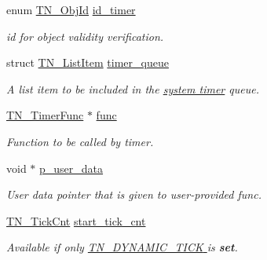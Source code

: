 \begin{DoxyCompactItemize}
\item 
enum \hyperlink{tn__common_8h_ae779dd1f6735f6e139fb70acd004d976}{T\+N\+\_\+\+Obj\+Id} \hyperlink{structTN__Timer_a27482d3470455064da95b9453ae87156}{id\+\_\+timer}
\begin{DoxyCompactList}\small\item\em id for object validity verification. \end{DoxyCompactList}\item 
\mbox{\label{structTN__Timer_a9418f1d84fa83d87197f3457ddb74e27}} 
struct \hyperlink{structTN__ListItem}{T\+N\+\_\+\+List\+Item} \hyperlink{structTN__Timer_a9418f1d84fa83d87197f3457ddb74e27}{timer\+\_\+queue}
\begin{DoxyCompactList}\small\item\em A list item to be included in the {\itshape \hyperlink{time_ticks}{system timer}} queue. \end{DoxyCompactList}\item 
\mbox{\label{structTN__Timer_a154ff9bb98135481b1874bdd8d6f2b9c}} 
\hyperlink{tn__timer_8h_a3139b6e571f7bd3d304a7bb87b5b2459}{T\+N\+\_\+\+Timer\+Func} $\ast$ \hyperlink{structTN__Timer_a154ff9bb98135481b1874bdd8d6f2b9c}{func}
\begin{DoxyCompactList}\small\item\em Function to be called by timer. \end{DoxyCompactList}\item 
\mbox{\label{structTN__Timer_aaf753d5fb1001702f07379b2ed7ac177}} 
void $\ast$ \hyperlink{structTN__Timer_aaf753d5fb1001702f07379b2ed7ac177}{p\+\_\+user\+\_\+data}
\begin{DoxyCompactList}\small\item\em User data pointer that is given to user-\/provided {\ttfamily func}. \end{DoxyCompactList}\item 
\hyperlink{tn__common_8h_ac885b63d00c063de61cdbd80bf26d8aa}{T\+N\+\_\+\+Tick\+Cnt} \hyperlink{structTN__Timer_ab1410fa78c9099a6bc4dd3f43f1f52e4}{start\+\_\+tick\+\_\+cnt}
\begin{DoxyCompactList}\small\item\em {\itshape Available if only \hyperlink{tn__cfg__default_8h_aaee875834a86f961318c584095c366fe}{{\ttfamily T\+N\+\_\+\+D\+Y\+N\+A\+M\+I\+C\+\_\+\+T\+I\+CK} } is {\bfseries set}.} \end{DoxyCompactList}\item 

\end{DoxyCompactItemize}

